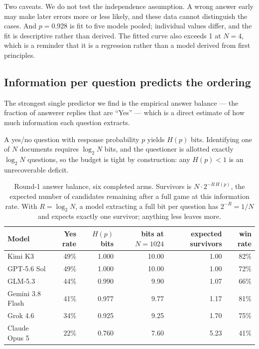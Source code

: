 \documentclass[11pt]{article}
\begin{document}
Two caveats. We do not test the independence assumption. A wrong answer early
may make later errors more or less likely, and these data cannot distinguish
the cases.
And $p=0.928$ is fit to five models pooled; individual values differ, and the
fit is descriptive rather than derived. The fitted curve also exceeds 1 at
$N{=}4$, which is a reminder that it is a regression rather than a model
derived from first principles.



\subsection{Information per question predicts the ordering}
\label{sec:bits}

The strongest single predictor we find is the empirical answer balance --- the
fraction of answerer replies that are ``Yes'' --- which is a direct estimate of
how much information each question extracts.

A yes/no question with response probability $p$ yields $H(p)$ bits. Identifying
one of $N$ documents requires $\log_2 N$ bits, and the questioner is allotted
exactly $\log_2 N$ questions, so the budget is tight by construction: any
$H(p) < 1$ is an unrecoverable deficit.

\begin{table}[h]
\centering\small
\begin{tabular}{lrrrrr}
\toprule
Model & Yes rate & $H(p)$ bits & bits at $N{=}1024$ & expected survivors & win rate \\
\midrule
Kimi K3          & 49\% & 1.000 & 10.00 & 1.00 & 82\% \\
GPT-5.6 Sol      & 49\% & 1.000 & 10.00 & 1.00 & 72\% \\
GLM-5.3          & 44\% & 0.990 &  9.90 & 1.07 & 66\% \\
Gemini 3.8 Flash & 41\% & 0.977 &  9.77 & 1.17 & 81\% \\
Grok 4.6         & 34\% & 0.925 &  9.25 & 1.70 & 75\% \\
Claude Opus 5    & 22\% & 0.760 &  7.60 & 5.23 & 41\% \\
\bottomrule
\end{tabular}
\caption{Round-1 answer balance, six completed arms. Survivors is $N \cdot 2^{-R\,H(p)}$, the expected
number of candidates remaining after a full game at this information rate. With
$R=\log_2 N$, a model extracting a full bit per question has
$2^{-R} = 1/N$ and expects exactly one survivor; anything less leaves more.}
\end{table}
\end{document}
